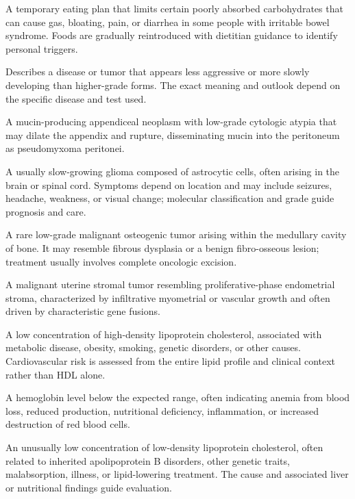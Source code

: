  A temporary eating plan that limits certain poorly absorbed carbohydrates that can cause gas, bloating, pain, or diarrhea in some people with irritable bowel syndrome. Foods are gradually reintroduced with dietitian guidance to identify personal triggers.

 Describes a disease or tumor that appears less aggressive or more slowly developing than higher-grade forms. The exact meaning and outlook depend on the specific disease and test used.

 A mucin-producing appendiceal neoplasm with low-grade cytologic atypia that may dilate the appendix and rupture, disseminating mucin into the peritoneum as pseudomyxoma peritonei.

 A usually slow-growing glioma composed of astrocytic cells, often arising in the brain or spinal cord. Symptoms depend on location and may include seizures, headache, weakness, or visual change; molecular classification and grade guide prognosis and care.

 A rare low-grade malignant osteogenic tumor arising within the medullary cavity of bone. It may resemble fibrous dysplasia or a benign fibro-osseous lesion; treatment usually involves complete oncologic excision.

 A malignant uterine stromal tumor resembling proliferative-phase endometrial stroma, characterized by infiltrative myometrial or vascular growth and often driven by characteristic gene fusions.

 A low concentration of high-density lipoprotein cholesterol, associated with metabolic disease, obesity, smoking, genetic disorders, or other causes. Cardiovascular risk is assessed from the entire lipid profile and clinical context rather than HDL alone.

 A hemoglobin level below the expected range, often indicating anemia from blood loss, reduced production, nutritional deficiency, inflammation, or increased destruction of red blood cells.

 An unusually low concentration of low-density lipoprotein cholesterol, often related to inherited apolipoprotein B disorders, other genetic traits, malabsorption, illness, or lipid-lowering treatment. The cause and associated liver or nutritional findings guide evaluation.

